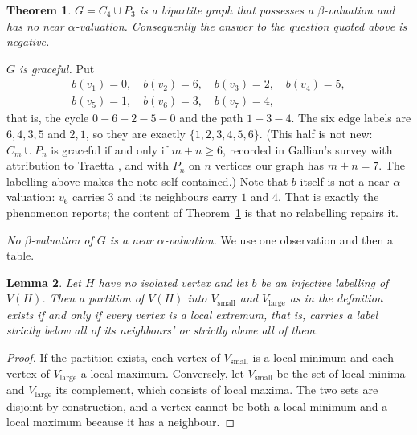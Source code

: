 \documentclass[11pt]{amsart}
\newtheorem{theorem}{Theorem}
\newtheorem{lemma}[theorem]{Lemma}
\theoremstyle{remark}
\begin{document}
\begin{theorem}\label{thm:main}
$G=C_4\cup P_3$ is a bipartite graph that possesses a $\beta$-valuation and has
no near $\alpha$-valuation. Consequently the answer to the question quoted above
is negative.
\end{theorem}

\emph{$G$ is graceful.} Put
\begin{gather*}
 b(v_1)=0,\quad b(v_2)=6,\quad b(v_3)=2,\quad b(v_4)=5,\\
 b(v_5)=1,\quad b(v_6)=3,\quad b(v_7)=4,
\end{gather*}
that is, the cycle $0-6-2-5-0$ and the path $1-3-4$. The six edge labels are
$6,4,3,5$ and $2,1$, so they are exactly $\{1,2,3,4,5,6\}$. (This half is not
new: $C_m\cup P_n$ is graceful if and only if $m+n\ge6$, recorded in Gallian's
survey \cite[Table~1]{Gal} with attribution to Traetta \cite{Tra}, and with
$P_n$ on $n$ vertices our graph has $m+n=7$. The labelling above makes the note
self-contained.) Note that $b$ itself is not a near $\alpha$-valuation: $v_6$
carries $3$ and its neighbours carry $1$ and $4$. That is exactly the phenomenon
\cite{AHM} reports; the content of Theorem~\ref{thm:main} is that no relabelling
repairs it.

\emph{No $\beta$-valuation of $G$ is a near $\alpha$-valuation.} We use one
observation and then a table.

\begin{lemma}\label{lem:extremal}
Let $H$ have no isolated vertex and let $b$ be an injective labelling of
$V(H)$. Then a partition of $V(H)$ into $V_{\mathrm{small}}$ and
$V_{\mathrm{large}}$ as in the definition exists if and only if every vertex is
a local extremum, that is, carries a label strictly below all of its
neighbours' or strictly above all of them.
\end{lemma}

\begin{proof}
If the partition exists, each vertex of $V_{\mathrm{small}}$ is a local minimum
and each vertex of $V_{\mathrm{large}}$ a local maximum. Conversely, let
$V_{\mathrm{small}}$ be the set of local minima and $V_{\mathrm{large}}$ its
complement, which consists of local maxima. The two sets are disjoint by
construction, and a vertex cannot be both a local minimum and a local maximum
because it has a neighbour.
\end{proof}
\end{document}
